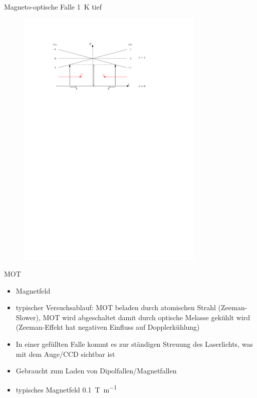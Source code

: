 \documentclass[12pt]{beamer}
\begin{document}
\begin{frame}{Magneto-optische Falle}
\SI{1}{K} tief

\begin{figure}[h]
	\centering
	\includegraphics[width=0.8\textwidth]{./figures/mot.pdf}
\end{figure}
\end{frame}

\begin{frame}{MOT}
	\begin{itemize}
		\item Magnetfeld
		\item typischer Versuchsablauf: MOT beladen durch atomischen Strahl (Zeeman-Slower), MOT wird abgeschaltet damit durch optische Melasse gekühlt wird (Zeeman-Effekt hat negativen Einfluss auf Dopplerkühlung)
		\item In einer gefüllten Falle kommt es zur ständigen Streuung des Laserlichts, was mit dem Auge/CCD sichtbar ist
		\item Gebraucht zum Laden von Dipolfallen/Magnetfallen
		\item typisches Magnetfeld \SI{0.1}{\tesla\per\metre}
	\end{itemize}
\end{frame}
\end{document}
